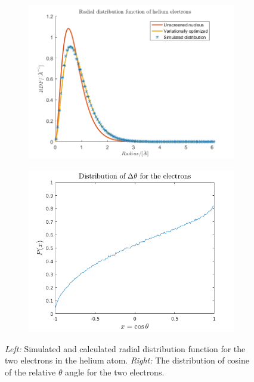 \begin{figure}[H]
    \centering
    \captionsetup[subfigure]{justification=centering}
    \begin{subfigure}[b]{0.40\textwidth}
        \centering
        \includegraphics[width=\textwidth]{graphics/task1/radius.png}
    \end{subfigure}
    \begin{subfigure}[b]{0.40\textwidth}
        \centering
        \includegraphics[width=\textwidth]{graphics/task1/angle_diff_dist.png}
    \end{subfigure}
    \caption{\textit{Left:} Simulated and calculated radial distribution function for the two electrons in the helium atom. \textit{Right:} The distribution of cosine of the relative $\theta$ angle for the two electrons.}
    \label{fig:RDF}
\end{figure}

